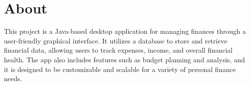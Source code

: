 \section{About}

This project is a Java-based desktop application for managing finances through a user-friendly graphical interface. It utilizes a database to store and retrieve financial data, allowing users to track expenses, income, and overall financial health. The app also includes features such as budget planning and analysis, and it is designed to be customizable and scalable for a variety of personal finance needs.